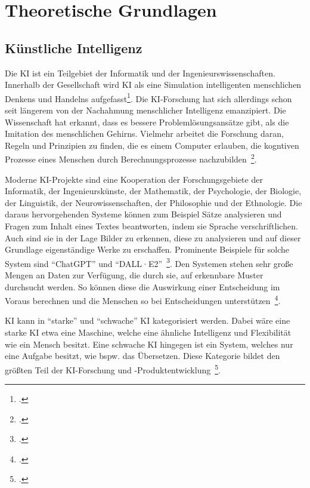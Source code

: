 \newpage
\section{Theoretische Grundlagen} \label{grundlange}

\subsection{Künstliche Intelligenz}

Die \ac{KI} ist ein Teilgebiet der Informatik und der Ingenieurswissenschaften. Innerhalb der Gesellschaft wird \ac{KI} als eine Simulation intelligenten 
menschlichen Denkens und Handelns aufgefasst\footcite[][]{Mainzer.2019}. 
Die KI-Forschung hat sich allerdings schon seit längerem von der Nachahmung menschlicher Intelligenz emanzipiert. 
Die Wissenschaft hat erkannt, dass es bessere Problemlösungsansätze gibt, als die Imitation des menschlichen Gehirns.
Vielmehr arbeitet die Forschung daran, Regeln und Prinzipien zu finden, die es einem Computer erlauben, die kogntiven Prozesse eines Menschen durch Berechnungsprozesse 
nachzubilden~\footcite[\vglf][]{Lenzen.2020}.

Moderne KI-Projekte sind eine Kooperation der Forschungsgebiete der Informatik, der Ingenieurskünste, der Mathematik, der Psychologie, der Biologie, der Linguistik,
der Neurowissenschaften, der Philosophie und der Ethnologie.
Die daraus hervorgehenden Systeme können zum Beispiel Sätze analysieren und Fragen zum Inhalt eines Textes beantworten, indem sie Sprache verschriftlichen.
Auch sind sie in der Lage Bilder zu erkennen, diese zu analysieren und auf dieser Grundlage eigenständige Werke zu erschaffen.
Prominente Beispiele für solche System sind \enquote{ChatGPT} und \enquote{DALL·E2}~\footcite[\vglf][]{Lenzen.2020}.
Den Systemen stehen sehr große Mengen an Daten zur Verfügung, die durch sie, auf erkennbare Muster durchsucht werden. So können diese die Auswirkung einer Entscheidung im Voraus 
berechnen und die Menschen so bei Entscheidungen unterstützen~\footcite[\vglf][]{Lenzen.2020}.

\ac{KI} kann in \enquote{starke} und \enquote{schwache} \ac{KI} kategorisiert werden. Dabei wäre eine starke \ac{KI} etwa eine Maschine,
welche eine ähnliche Intelligenz und Flexibilität wie ein Mensch besitzt. Eine schwache \ac{KI} hingegen ist ein System, welches nur eine Aufgabe besitzt, wie bspw. das Übersetzen.
Diese Kategorie bildet den größten Teil der KI-Forschung und -Produktentwicklung~\footcite[\vglf][]{Lenzen.2020}.

